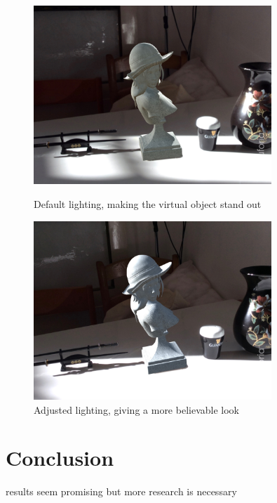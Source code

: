 \documentclass{article}
\begin{document}
\begin{figure}[h]
\centering
\includegraphics[width=0.8\textwidth]{Figures/fake.jpg}
\caption{Default lighting, making the virtual object stand out}
\includegraphics[width=0.8\textwidth]{Figures/realish.jpg}
\caption{Adjusted lighting, giving a more believable look}
\end{figure}


\clearpage
\section{Conclusion}
results seem promising but more research is necessary



\end{document}
